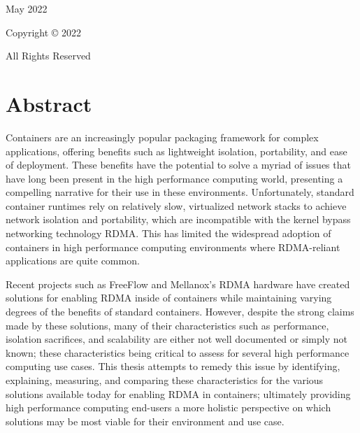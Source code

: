 \documentclass[12pt,titlepage]{article}
\begin{document}
\begin{titlingpage}
\begin{center}
\begin{tabularx}{\textwidth} {@{}X X@{}}
		\end{tabularx}
	\end{center}

	\vspace{2em}
	\begin{center}
		May 2022\vspace{-1em}

		Copyright \copyright{} 2022\vspace{-1em}

		All Rights Reserved
	\end{center}
\end{titlingpage}


\setcounter{page}{2}
\section*{Abstract}
Containers are an increasingly popular packaging framework for complex applications, offering benefits such as lightweight isolation, portability, and ease of deployment.
These benefits have the potential to solve a myriad of issues that have long been present in the high performance computing world, presenting a compelling narrative for their use in these environments.
Unfortunately, standard container runtimes rely on relatively slow, virtualized network stacks to achieve network isolation and portability, which are incompatible with the kernel bypass networking technology RDMA\@.
This has limited the widespread adoption of containers in high performance computing environments where RDMA-reliant applications are quite common.

Recent projects such as FreeFlow and Mellanox's RDMA hardware have created solutions for enabling RDMA inside of containers while maintaining varying degrees of the benefits of standard containers.
However, despite the strong claims made by these solutions, many of their characteristics such as performance, isolation sacrifices, and scalability are either not well documented or simply not known; these characteristics being critical to assess for several high performance computing use cases.
This thesis attempts to remedy this issue by identifying, explaining, measuring, and comparing these characteristics for the various solutions available today for enabling RDMA in containers;
ultimately providing high performance computing end-users a more holistic perspective on which solutions may be most viable for their environment and use case.

\renewcommand*\contentsname{Table of Contents}
\tableofcontents{}
\clearpage
\setcounter{page}{1}
\end{document}
